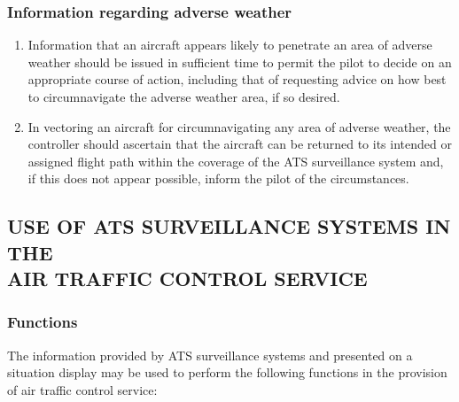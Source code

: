 \subsubsection{Information regarding adverse weather}

\begin{enumerate}
    \item Information that an aircraft appears likely to penetrate an area of adverse weather should be issued in sufficient time to permit the pilot to decide on an appropriate course of action, including that of requesting advice on how best to circumnavigate the adverse weather area, if so desired.
    \item In vectoring an aircraft for circumnavigating any area of adverse weather, the controller should ascertain that the aircraft can be returned to its intended or assigned flight path within the coverage of the ATS surveillance system and, if this does not appear possible, inform the pilot of the circumstances.
\end{enumerate}

\subsection[Use of ATS surveillance systems in the air traffic control service]{USE OF ATS SURVEILLANCE SYSTEMS IN THE \\ AIR TRAFFIC CONTROL SERVICE}


\subsubsection{Functions}

The information provided by ATS surveillance systems and presented on a situation display may be used to perform the following functions in the provision of air traffic control service:

